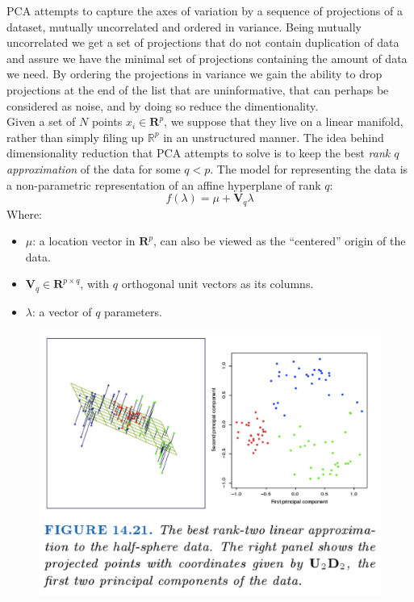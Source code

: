 \documentclass[a4paper]{article}
\begin{document}
PCA attempts to capture the axes of variation by a sequence of projections of a dataset, mutually uncorrelated and ordered in variance. Being mutually uncorrelated we get a set of projections that do not contain duplication of data and assure we have the minimal set of projections containing the amount of data we need. By ordering the projections in variance we gain the ability to drop projections at the end of the list that are uninformative, that can perhaps be considered as noise, and by doing so reduce the dimentionality.\\

Given a set of $N$ points $x_i \in \mathbf{R}^p$, we suppose that they live on a linear manifold, rather than simply filing up $\mathbb{R}^p$ in an unstructured manner. The idea behind dimensionality reduction that PCA attempts to solve is to keep the best \emph{rank $q$ approximation} of the data for some $q<p$.  The model for representing the data is a non-parametric representation of an affine hyperplane of rank $q$:
$$f(\lambda)= \mu+\mathbf{V}_q \lambda$$
Where:
\begin{itemize}
\item $\mu$: a location vector in $\mathbf{R}^p$, can also be viewed as the ``centered'' origin of the data.
\item $\mathbf{V}_q \in \mathbf{R}^{p\times q}$, with $q$ orthogonal unit vectors as its columns.
\item $\lambda$: a vector of $q$ parameters.
\end{itemize}

\begin{figure}
\centering
\includegraphics[width=1.0\textwidth]{ThreeDimReduction.png}
\caption{\label{fig:3DimReduction}}
\end{figure}
\end{document}
